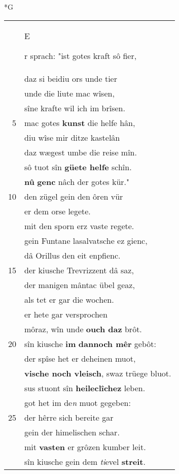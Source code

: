 \documentclass[8pt,a4paper,notitlepage]{article}
\begin{document}
\begin{table}[ht]
\begin{minipage}[t]{0.5\linewidth}
\small
\begin{center}*G
\end{center}
\begin{tabular}{rl}
 & \begin{large}E\end{large}r sprach: "ist gotes kraft sô fier,\\ 
 & daz si beidiu ors unde tier\\ 
 & unde die liute mac wîsen,\\ 
 & sîne krafte wil ich im brîsen.\\ 
5 & mac gotes \textbf{kunst} die helfe hân,\\ 
 & diu wîse mir ditze kastelân\\ 
 & daz wægest umbe die reise mîn.\\ 
 & sô tuot sîn \textbf{güete helfe} schîn.\\ 
 & \textbf{nû} \textbf{genc} nâch der gotes kür."\\ 
10 & den zügel gein den ôren vür\\ 
 & er dem orse legete.\\ 
 & mit den sporn erz vaste regete.\\ 
 & gein Funtane lasalvatsche ez gienc,\\ 
 & dâ Orillus den eit enpfienc.\\ 
15 & der kiusche Trevrizzent dâ saz,\\ 
 & der manigen mântac übel geaz,\\ 
 & als tet er gar die wochen.\\ 
 & er hete gar versprochen\\ 
 & môraz, wîn unde \textbf{ouch daz} brôt.\\ 
20 & sîn kiusche \textbf{im} \textbf{dannoch mêr} gebôt:\\ 
 & der spîse het er deheinen muot,\\ 
 & \textbf{vische noch vleisch}, swaz trüege bluot.\\ 
 & sus stuont sîn \textbf{heileclîchez} leben.\\ 
 & got het im de\textit{n} muot gegeben:\\ 
25 & der hêrre sich bereite gar\\ 
 & gein der himelischen schar.\\ 
 & mit \textbf{vasten} er grôzen kumber leit.\\ 
 & sîn kiusche gein dem \textit{ti}evel \textbf{streit}.\\ 

\end{tabular}
\end{minipage}
\end{table}
\end{document}
